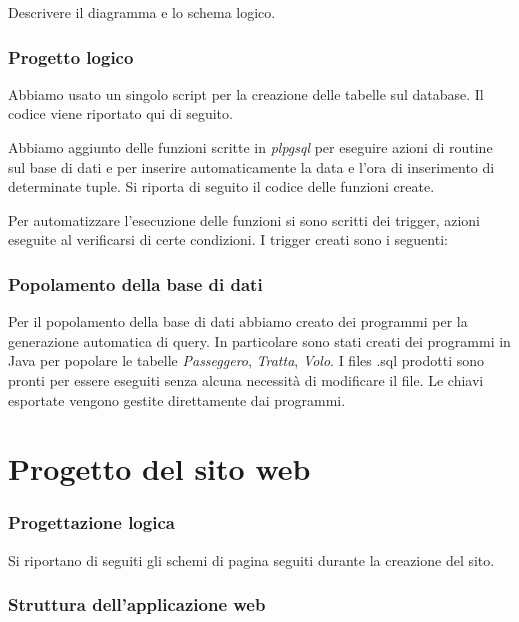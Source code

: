 \documentclass[a4paper,10pt]{article}
\begin{document}
Descrivere il diagramma e lo schema logico.

\section{Progetto logico}

Abbiamo usato un singolo script per la creazione delle tabelle sul database. Il codice viene riportato qui di seguito.



Abbiamo aggiunto delle funzioni scritte in \textit{plpgsql} per eseguire azioni di routine sul base di dati e per inserire automaticamente la data e l'ora di inserimento di determinate tuple.
Si riporta di seguito il codice delle funzioni create.



Per automatizzare l'esecuzione delle funzioni si sono scritti dei trigger, azioni eseguite al verificarsi di certe condizioni. I trigger creati sono i seguenti:



\section{Popolamento della base di dati}
Per il popolamento della base di dati abbiamo creato dei programmi per la generazione automatica di query.
In particolare sono stati creati dei programmi in Java per popolare le tabelle \textit{Passeggero}, \textit{Tratta}, \textit{Volo}. I files .sql prodotti sono pronti 
per essere eseguiti senza alcuna necessit\`a di modificare il file. Le chiavi esportate vengono gestite direttamente dai programmi.


\part{Progetto del sito web}

\section{Progettazione logica}

Si riportano di seguiti gli schemi di pagina seguiti durante la creazione del sito.

\section{Struttura dell'applicazione web}
\end{document}
